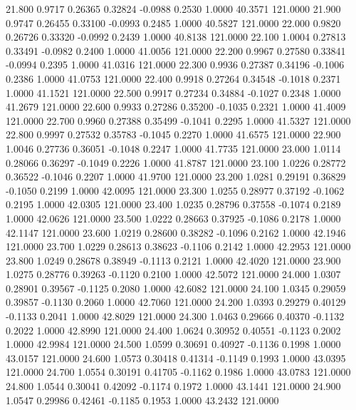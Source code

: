   21.800   0.9717   0.26365   0.32824  -0.0988   0.2530   1.0000  40.3571 121.0000
  21.900   0.9747   0.26455   0.33100  -0.0993   0.2485   1.0000  40.5827 121.0000
  22.000   0.9820   0.26726   0.33320  -0.0992   0.2439   1.0000  40.8138 121.0000
  22.100   1.0004   0.27813   0.33491  -0.0982   0.2400   1.0000  41.0056 121.0000
  22.200   0.9967   0.27580   0.33841  -0.0994   0.2395   1.0000  41.0316 121.0000
  22.300   0.9936   0.27387   0.34196  -0.1006   0.2386   1.0000  41.0753 121.0000
  22.400   0.9918   0.27264   0.34548  -0.1018   0.2371   1.0000  41.1521 121.0000
  22.500   0.9917   0.27234   0.34884  -0.1027   0.2348   1.0000  41.2679 121.0000
  22.600   0.9933   0.27286   0.35200  -0.1035   0.2321   1.0000  41.4009 121.0000
  22.700   0.9960   0.27388   0.35499  -0.1041   0.2295   1.0000  41.5327 121.0000
  22.800   0.9997   0.27532   0.35783  -0.1045   0.2270   1.0000  41.6575 121.0000
  22.900   1.0046   0.27736   0.36051  -0.1048   0.2247   1.0000  41.7735 121.0000
  23.000   1.0114   0.28066   0.36297  -0.1049   0.2226   1.0000  41.8787 121.0000
  23.100   1.0226   0.28772   0.36522  -0.1046   0.2207   1.0000  41.9700 121.0000
  23.200   1.0281   0.29191   0.36829  -0.1050   0.2199   1.0000  42.0095 121.0000
  23.300   1.0255   0.28977   0.37192  -0.1062   0.2195   1.0000  42.0305 121.0000
  23.400   1.0235   0.28796   0.37558  -0.1074   0.2189   1.0000  42.0626 121.0000
  23.500   1.0222   0.28663   0.37925  -0.1086   0.2178   1.0000  42.1147 121.0000
  23.600   1.0219   0.28600   0.38282  -0.1096   0.2162   1.0000  42.1946 121.0000
  23.700   1.0229   0.28613   0.38623  -0.1106   0.2142   1.0000  42.2953 121.0000
  23.800   1.0249   0.28678   0.38949  -0.1113   0.2121   1.0000  42.4020 121.0000
  23.900   1.0275   0.28776   0.39263  -0.1120   0.2100   1.0000  42.5072 121.0000
  24.000   1.0307   0.28901   0.39567  -0.1125   0.2080   1.0000  42.6082 121.0000
  24.100   1.0345   0.29059   0.39857  -0.1130   0.2060   1.0000  42.7060 121.0000
  24.200   1.0393   0.29279   0.40129  -0.1133   0.2041   1.0000  42.8029 121.0000
  24.300   1.0463   0.29666   0.40370  -0.1132   0.2022   1.0000  42.8990 121.0000
  24.400   1.0624   0.30952   0.40551  -0.1123   0.2002   1.0000  42.9984 121.0000
  24.500   1.0599   0.30691   0.40927  -0.1136   0.1998   1.0000  43.0157 121.0000
  24.600   1.0573   0.30418   0.41314  -0.1149   0.1993   1.0000  43.0395 121.0000
  24.700   1.0554   0.30191   0.41705  -0.1162   0.1986   1.0000  43.0783 121.0000
  24.800   1.0544   0.30041   0.42092  -0.1174   0.1972   1.0000  43.1441 121.0000
  24.900   1.0547   0.29986   0.42461  -0.1185   0.1953   1.0000  43.2432 121.0000
